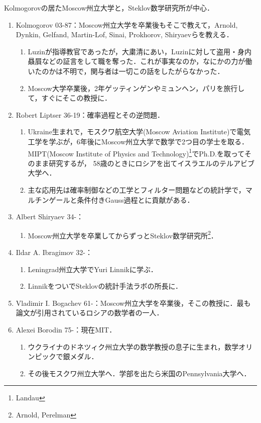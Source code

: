 \documentclass[uplatex,dvipdfmx]{jsreport}
\begin{document}
\begin{history}[Russia学派]
    Kolmogorovの居たMoscow州立大学と，Steklov数学研究所が中心．
    \begin{enumerate}
        \item Kolmogorov 03-87：Moscow州立大学を卒業後もそこで教えて，Arnold, Dynkin, Gelfand, Martin-Lof, Sinai, Prokhorov, Shiryaevらを教える．
        \begin{enumerate}
            \item Luzinが指導教官であったが，大粛清にあい，Luzinに対して盗用・身内贔屓などの証言をして職を奪った．これが事実なのか，なにかの力が働いたのかは不明で，関与者は一切この話をしたがらなかった．
            \item Moscow大学卒業後，2年ゲッティンゲンやミュンヘン，パリを旅行して，すぐにそこの教授に．
        \end{enumerate}
        \item Robert Liptser 36-19：確率過程とその逆問題．
        \begin{enumerate}
            \item Ukraine生まれで，モスクワ航空大学(Moscow Aviation Institute)で電気工学を学ぶが，6年後にMoscow州立大学で数学で2つ目の学士を取る．MIPT(Moscow Institute of Physics and Technology)\footnote{Landau}でPh.D.を取ってそのまま研究するが，
            58歳のときにロシアを出てイスラエルのテルアビブ大学へ．
            \item 主な応用先は確率制御などの工学とフィルター問題などの統計学で，マルチンゲールと条件付きGauss過程とに貢献がある．
        \end{enumerate}
        \item Albert Shiryaev 34-：
        \begin{enumerate}
            \item Moscow州立大学を卒業してからずっとSteklov数学研究所\footnote{Arnold, Perelman}．
        \end{enumerate}
        \item Ildar A. Ibragimov 32-：
        \begin{enumerate}
            \item Leningrad州立大学でYuri Linnikに学ぶ．
            \item LinnikをついでSteklovの統計手法ラボの所長に．
        \end{enumerate}
        \item Vladimir I. Bogachev 61-：Moscow州立大学を卒業後，そこの教授に．最も論文が引用されているロシアの数学者の一人．
        \item Alexei Borodin 75-：現在MIT．
        \begin{enumerate}
            \item ウクライナのドネツィク州立大学の数学教授の息子に生まれ，数学オリンピックで銀メダル．
            \item その後モスクワ州立大学へ．学部を出たら米国のPennsylvania大学へ．
        \end{enumerate}
    \end{enumerate}
\end{history}
\end{document}
